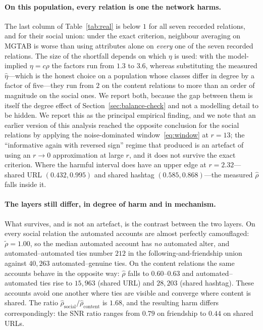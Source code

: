 \documentclass[../elsevier.tex]{subfiles}
\begin{document}
\paragraph{On this population, every relation is one the network harms.}
The last column of Table~\ref{tab:real} is below $1$ for all seven recorded relations, and for their social union: under
the exact criterion, neighbour averaging on MGTAB is worse than using attributes alone
on \emph{every} one of the seven recorded relations. The size of the shortfall depends
on which $\eta$ is used: with the model-implied $\eta = c\rho$ the factors run from
$1.3$ to $3.6$, whereas substituting the measured $\hat\eta$---which is the honest
choice on a population whose classes differ in degree by a factor of five---they run from
$2$ on the content relations to more than an order of magnitude on the social ones. We
report both, because the gap between them is itself the degree effect of
Section~\ref{sec:balance-check} and not a modelling detail to be hidden. We report this
as the principal empirical finding, and we note that an earlier version of this
analysis reached the opposite conclusion for the social relations by applying the
noise-dominated window~\eqref{eq:window} at $r = 13$; the ``informative again with
reversed sign'' regime that produced is an artefact of using an $r \to 0$
approximation at large $r$, and it does not survive the exact criterion. Where the
harmful interval does have an upper edge at $r = 2.32$---shared URL $(0.432, 0.995)$
and shared hashtag $(0.585, 0.868)$---the measured $\hat\rho$ falls inside it.

\paragraph{The layers still differ, in degree of harm and in mechanism.}
What survives, and is not an artefact, is the contrast between the two layers.
On every social relation the automated accounts are almost perfectly camouflaged:
$\tilde\rho = 1.00$, so the median automated account has \emph{no} automated alter,
and automated--automated ties number $212$ in the following-and-friendship union
against $40{,}263$ automated--genuine ties. On the content relations the same accounts
behave in the opposite way: $\hat\rho$ falls to $0.60$--$0.63$ and
automated--automated ties rise to $15{,}963$ (shared URL) and $28{,}203$ (shared
hashtag). These accounts avoid one another where ties are visible and converge where
content is shared. The ratio $\hat\rho_{\text{social}}/\hat\rho_{\text{content}}$ is
$1.68$, and the resulting harm differs correspondingly: the SNR ratio ranges from
$0.79$ on friendship to $0.44$ on shared URLs.
\end{document}
